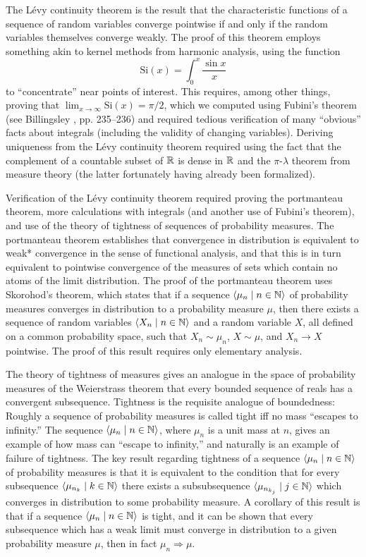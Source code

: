 \documentclass{article}
\theoremstyle{definition}
\newcommand{\bldseq}[2]{\langle{#1}\mid{#2}\rangle}
\newcommand\Si{\text{Si}}
\begin{document}
The L\'evy continuity theorem is the result that the characteristic functions of a sequence of random variables converge pointwise if and only if the random variables themselves converge weakly. The proof of this theorem employs something akin to kernel methods from harmonic analysis, using the function
\[ \Si(x) = \int_0^x \frac{\sin x}{x} \]
to ``concentrate'' near points of interest. This requires, among other things, proving that $\lim_{x \rightarrow \infty} \Si(x) = \pi/2$, which we computed using Fubini's theorem (see Billingsley \cite{billingsley}, pp. 235--236) and required tedious verification of many ``obvious'' facts about integrals (including the validity of changing variables). Deriving uniqueness from the L\'evy continuity theorem required using the fact that the complement of a countable subset of $\mathbb{R}$ is dense in $\mathbb{R}$ and the $\pi$-$\lambda$ theorem from measure theory (the latter fortunately having already been formalized).

Verification of the L\'evy continuity theorem required proving the portmanteau theorem, more calculations with integrals (and another use of Fubini's theorem), and use of the theory of tightness of sequences of probability measures. The portmanteau theorem establishes that convergence in distribution is equivalent to weak* convergence in the sense of functional analysis, and that this is in turn equivalent to pointwise convergence of the measures of sets which contain no atoms of the limit distribution. The proof of the portmanteau theorem uses Skorohod's theorem, which states that if a sequence $\bldseq{\mu_n}{n \in \N}$ of probability measures converges in distribution to a probability measure $\mu$, then there exists a sequence of random variables $\bldseq{X_n}{n \in \N}$ and a random variable $X$, all defined on a common probability space, such that $X_n \sim \mu_n$, $X \sim \mu$, and $X_n \rightarrow X$ pointwise. The proof of this result requires only elementary analysis.

The theory of tightness of measures gives an analogue in the space of probability measures of the Weierstrass theorem that every bounded sequence of reals has a convergent subsequence. Tightness is the requisite analogue of boundedness: Roughly a sequence of probability measures is called tight iff no mass ``escapes to infinity.'' The sequence $\bldseq{\mu_n}{n \in \N}$, where $\mu_n$ is a unit mass at $n$, gives an example of how mass can ``escape to infinity,'' and naturally is an example of failure of tightness. The key result regarding tightness of a sequence $\bldseq{\mu_n}{n \in \N}$ of probability measures is that it is equivalent to the condition that for every subsequence $\bldseq{\mu_{n_k}}{k \in \N}$ there exists a subsubsequence $\bldseq{\mu_{n_{k_j}}}{j \in \N}$ which converges in distribution to some probability measure. A corollary of this result is that if a sequence $\bldseq{\mu_n}{n \in \N}$ is tight, and it can be shown that every subsequence which has a weak limit must converge in distribution to a given probability measure $\mu$, then in fact $\mu_n \Rightarrow \mu$.
\end{document}

